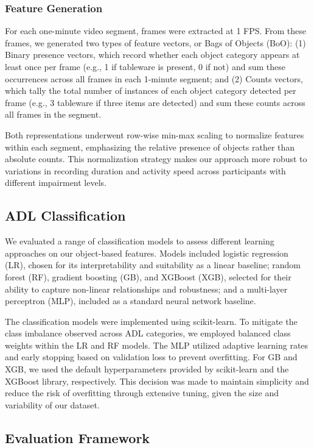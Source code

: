 \documentclass[journal,twoside,web]{ieeecolor}
\begin{document}
\subsubsection{Feature Generation}

For each one-minute video segment, frames were extracted at 1 FPS. From these frames, we generated two types of feature vectors, or Bags of Objects (BoO): (1) Binary presence vectors, which record whether each object category appears at least once per frame (e.g., 1 if tableware is present, 0 if not) and sum these occurrences across all frames in each 1-minute segment; and (2) Counts vectors, which tally the total number of instances of each object category detected per frame (e.g., 3 tableware if three items are detected) and sum these counts across all frames in the segment.

Both representations underwent row-wise min-max scaling to normalize features within each segment, emphasizing the relative presence of objects rather than absolute counts. This normalization strategy makes our approach more robust to variations in recording duration and activity speed across participants with different impairment levels.

\subsection{ADL Classification}

We evaluated a range of classification models to assess different learning approaches on our object-based features. Models included logistic regression (LR), chosen for its interpretability and suitability as a linear baseline; random forest (RF), gradient boosting (GB), and XGBoost (XGB), selected for their ability to capture non-linear relationships and robustness; and a multi-layer perceptron (MLP), included as a standard neural network baseline.

The classification models were implemented using scikit-learn. To mitigate the class imbalance observed across ADL categories, we employed balanced class weights within the LR and RF models. The MLP utilized adaptive learning rates and early stopping based on validation loss to prevent overfitting. For GB and XGB, we used the default hyperparameters provided by scikit-learn and the XGBoost library, respectively. This decision was made to maintain simplicity and reduce the risk of overfitting through extensive tuning, given the size and variability of our dataset.

\subsection{Evaluation Framework}
\end{document}
